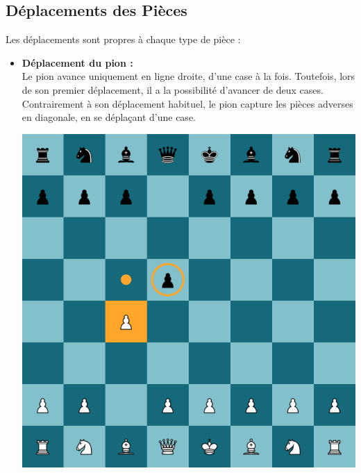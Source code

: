 \documentclass{article}
\begin{document}
\subsection{Déplacements des Pièces}
Les déplacements sont propres à chaque type de pièce :
\vspace{0.5cm}

\begin{itemize}
    \item \begin{minipage}{0.45\textwidth}
        \textbf{Déplacement du pion :} \\
        Le pion avance uniquement en ligne droite, d'une case à la fois. Toutefois, lors de son premier déplacement, 
        il a la possibilité d'avancer de deux cases. Contrairement à son déplacement habituel, le pion capture les pièces
         adverses en diagonale, en se déplaçant d'une case.
    \end{minipage}
    \hspace{0.05\textwidth}
    \begin{minipage}{0.45\textwidth}
        \centering
        \includegraphics[width=\textwidth]{pionMove.png}
    \end{minipage}

    \vspace{0.5cm}


\end{itemize}
\end{document}
